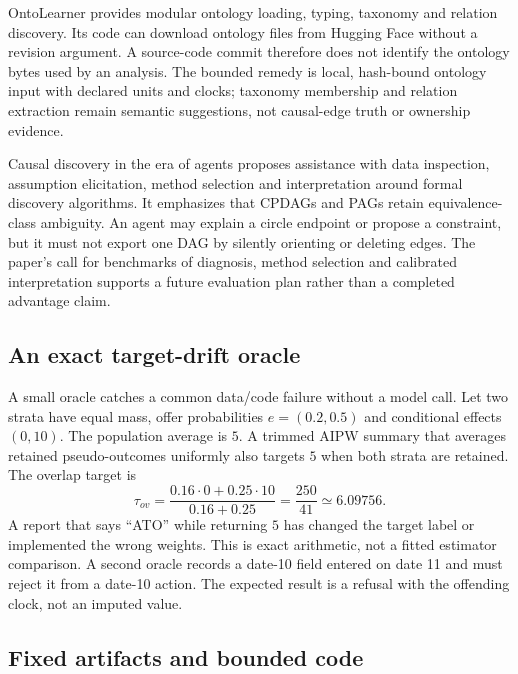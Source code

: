 OntoLearner provides modular ontology loading, typing, taxonomy and relation discovery. Its code can download ontology files from Hugging Face without a revision argument. A source-code commit therefore does not identify the ontology bytes used by an analysis. The bounded remedy is local, hash-bound ontology input with declared units and clocks; taxonomy membership and relation extraction remain semantic suggestions, not causal-edge truth or ownership evidence. \citep{exec13_data_ontolearner,exec13_data_ontolearner_code}

Causal discovery in the era of agents proposes assistance with data inspection, assumption elicitation, method selection and interpretation around formal discovery algorithms. It emphasizes that CPDAGs and PAGs retain equivalence-class ambiguity. An agent may explain a circle endpoint or propose a constraint, but it must not export one DAG by silently orienting or deleting edges. The paper's call for benchmarks of diagnosis, method selection and calibrated interpretation supports a future evaluation plan rather than a completed advantage claim. \citep{exec13_data_causaldiscovery}

\subsection{An exact target-drift oracle}

A small oracle catches a common data/code failure without a model call. Let two strata have equal mass, offer probabilities $e=(0.2,0.5)$ and conditional effects $(0,10)$. The population average is $5$. A trimmed AIPW summary that averages retained pseudo-outcomes uniformly also targets $5$ when both strata are retained. The overlap target is
\[
\tau_{ov}=\frac{0.16\cdot0+0.25\cdot10}{0.16+0.25}=\frac{250}{41}\simeq6.09756.
\]
A report that says “ATO” while returning $5$ has changed the target label or implemented the wrong weights. This is exact arithmetic, not a fitted estimator comparison. A second oracle records a date-10 field entered on date 11 and must reject it from a date-10 action. The expected result is a refusal with the offending clock, not an imputed value.

\subsection{Fixed artifacts and bounded code}

